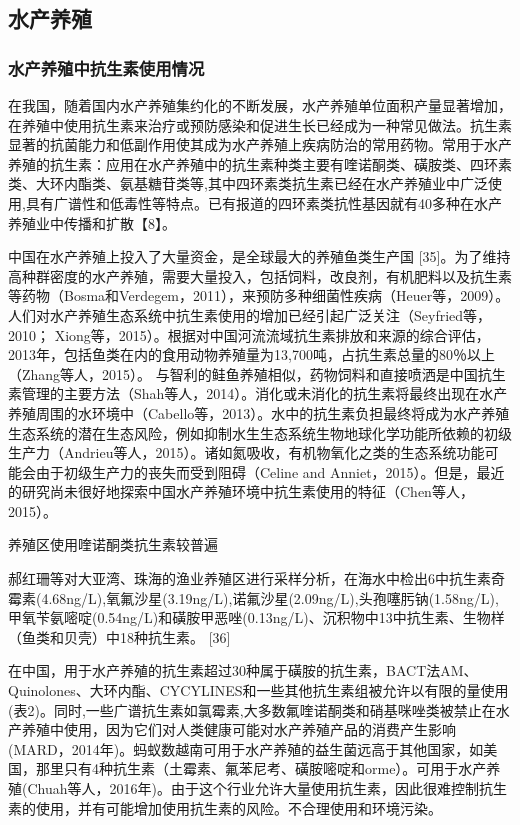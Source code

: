 \documentclass{SCIS2020cn}
\begin{document}
\subsection{水产养殖}
\subsubsection{水产养殖中抗生素使用情况}
在我国，随着国内水产养殖集约化的不断发展，水产养殖单位面积产量显著增加，在养殖中使用抗生素来治疗或预防感染和促进生长已经成为一种常见做法。抗生素显著的抗菌能力和低副作用使其成为水产养殖上疾病防治的常用药物。常用于水产养殖的抗生素：应用在水产养殖中的抗生素种类主要有喹诺酮类、磺胺类、四环素类、大环内酯类、氨基糖苷类等,其中四环素类抗生素已经在水产养殖业中广泛使用,具有广谱性和低毒性等特点。已有报道的四环素类抗性基因就有40多种在水产养殖业中传播和扩散【8】。

中国在水产养殖上投入了大量资金，是全球最大的养殖鱼类生产国 [35]。为了维持高种群密度的水产养殖，需要大量投入，包括饲料，改良剂，有机肥料以及抗生素等药物（Bosma和Verdegem，2011），来预防多种细菌性疾病（Heuer等，2009）。人们对水产养殖生态系统中抗生素使用的增加已经引起广泛关注（Seyfried等，2010； Xiong等，2015）。根据对中国河流流域抗生素排放和来源的综合评估，2013年，包括鱼类在内的食用动物养殖量为13,700吨，占抗生素总量的80％以上（Zhang等人，2015）。 与智利的鲑鱼养殖相似，药物饲料和直接喷洒是中国抗生素管理的主要方法（Shah等人，2014）。消化或未消化的抗生素将最终出现在水产养殖周围的水环境中（Cabello等，2013）。水中的抗生素负担最终将成为水产养殖生态系统的潜在生态风险，例如抑制水生生态系统生物地球化学功能所依赖的初级生产力（Andrieu等人，2015）。诸如氮吸收，有机物氧化之类的生态系统功能可能会由于初级生产力的丧失而受到阻碍（Celine and Anniet，2015）。但是，最近的研究尚未很好地探索中国水产养殖环境中抗生素使用的特征（Chen等人，2015）。

养殖区使用喹诺酮类抗生素较普遍

郝红珊等对大亚湾、珠海的渔业养殖区进行采样分析，在海水中检出6中抗生素奇霉素(4.68ng/L),氧氟沙星(3.19ng/L),诺氟沙星(2.09ng/L),头孢噻肟钠(1.58ng/L),甲氧苄氨嘧啶(0.54ng/L)和磺胺甲恶唑(0.13ng/L)、沉积物中13中抗生素、生物样（鱼类和贝壳）中18种抗生素。 [36]

在中国，用于水产养殖的抗生素超过30种属于磺胺的抗生素，BACT法AM、Quinolones、大环内酯、CYCYLINES和一些其他抗生素组被允许以有限的量使用(表2)。同时,一些广谱抗生素如氯霉素,大多数氟喹诺酮类和硝基咪唑类被禁止在水产养殖中使用，因为它们对人类健康可能对水产养殖产品的消费产生影响(MARD，2014年)。蚂蚁数越南可用于水产养殖的益生菌远高于其他国家，如美国，那里只有4种抗生素（土霉素、氟苯尼考、磺胺嘧啶和orme）。可用于水产养殖(Chuah等人，2016年)。由于这个行业允许大量使用抗生素，因此很难控制抗生素的使用，并有可能增加使用抗生素的风险。不合理使用和环境污染。
\end{document}
